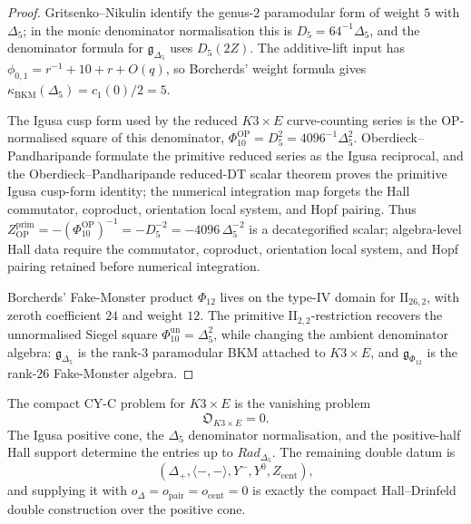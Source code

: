 \begin{proof}
Gritsenko--Nikulin identify the genus-\(2\) paramodular form of weight
\(5\) with \(\Delta_5\); in the monic denominator normalisation this is
\(D_5=64^{-1}\Delta_5\), and the denominator formula for
\(\mathfrak g_{\Delta_5}\) uses \(D_5(2Z)\). The additive-lift input has
\(\phi_{0,1}=r^{-1}+10+r+O(q)\), so Borcherds' weight formula gives
	\(\kappa_{\mathrm{BKM}}(\Delta_5)=c_1(0)/2=5\).

The Igusa cusp form used by the reduced \(K3\times E\) curve-counting
series is the OP-normalised square of this denominator,
\(\Phi_{10}^{\mathrm{OP}}=D_5^2=4096^{-1}\Delta_5^2\).
Oberdieck--Pandharipande formulate the primitive reduced series as the
Igusa reciprocal, and the Oberdieck--Pandharipande reduced-DT scalar theorem proves the
primitive Igusa cusp-form identity; the numerical integration map forgets the Hall
commutator, coproduct, orientation local system, and Hopf pairing.
Thus \(Z_{\mathrm{OP}}^{\mathrm{prim}}
=-(\Phi_{10}^{\mathrm{OP}})^{-1}=-D_5^{-2}
=-4096\,\Delta_5^{-2}\) is a
decategorified scalar; algebra-level Hall data require the commutator,
coproduct, orientation local system, and Hopf pairing retained before
numerical integration.

Borcherds' Fake-Monster product \(\Phi_{12}\) lives on the type-IV
domain for \(\mathrm{II}_{26,2}\), with zeroth coefficient \(24\) and
weight \(12\). The primitive \(\mathrm{II}_{2,2}\)-restriction recovers
the unnormalised Siegel square \(\Phi_{10}^{\mathrm{un}}=\Delta_5^2\),
while changing
the ambient denominator algebra: \(\mathfrak g_{\Delta_5}\) is the
rank-\(3\) paramodular BKM attached to \(K3\times E\), and
\(\mathfrak g_{\Phi_{12}}\) is the rank-\(26\) Fake-Monster algebra.
\end{proof}

\begin{corollary}
\label{gluing:cor:exact-cyc-obstruction}
The compact CY-C problem for \(K3\times E\) is the vanishing problem
\[
 \mathfrak O_{K3\times E}=0.
\]
The Igusa positive cone, the \(\Delta_5\) denominator normalisation, and
the positive-half Hall support determine the entries up to
\(Rad_{\Delta_5}\). The remaining double datum is
\[
(\Delta_+,\langle-,-\rangle,Y^-,Y^0,Z_{\mathrm{cent}}),
\]
and supplying it with
$o_\Delta=o_{\mathrm{pair}}=o_{\mathrm{cent}}=0$ is exactly the compact
Hall--Drinfeld double construction over the positive cone.
\end{corollary}

